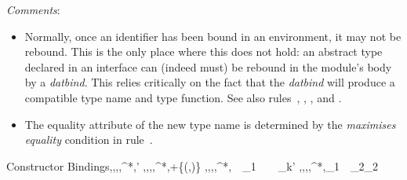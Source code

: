 \par\noindent\emph{Comments}:
\begin{itemize}
\item[\ruleref{rebind-tycon}]
Normally, once an identifier has been bound in an environment, it may not be rebound.
This is the only place where this does not hold: an abstract type declared
in an interface can (indeed must) be rebound in the module's body
by a \emph{datbind}. This relies critically on the fact that
the \emph{datbind} will produce a compatible type name and type function. See also
rules~, , ,
and .
\item[\ruleref{rebind-tycon}]
The equality attribute of the new type name is determined by
the \emph{maximises equality} condition in rule~.
\end{itemize}

\begin{relation}{Constructor Bindings}{\ME,\TE,\VE,\CE,\alpha^{*},\tau\vdash{}\Rightarrow\CE'}
	{\ME,\TE,\VE,\CE,\alpha^{*},\tau\vdash{}\Rightarrow\CE+\{\mapsto(,\sigma)\}}
\rruleskip
{}
	{\ME,\TE,\VE,\CE,\alpha^{*},\tau\vdash{}~~_1~\mtt{*}~\cdots~\mtt{*}~_{k}\Rightarrow\CE'}
\rruleskip
{}
	{\ME,\TE,\VE,\CE,\alpha^{*},\tau\vdash{}_1~\mtt{|}~_2\Rightarrow\CE_2}
\end{relation}

